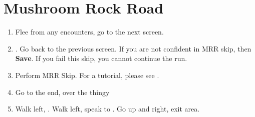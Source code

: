\chapter{Mushroom Rock Road}

\begin{enumerate}
    \item Flee from any encounters, go to the next screen.
    \item \save. Go back to the previous screen. If you are not confident in MRR skip, then \textbf{Save}. If you fail this skip, you cannot continue the run.
    \item Perform MRR Skip. For a tutorial, please see .
    \item Go to the end, over the thingy
    \item Walk left, \save. Walk left, speak to \auron. Go up and right, exit area.
\end{enumerate}
